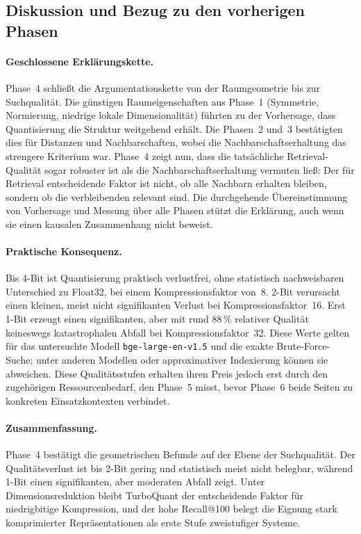 \subsection{Diskussion und Bezug zu den vorherigen Phasen}
%
\paragraph{Geschlossene Erklärungskette.}
Phase~4 schließt die Argumentationskette von der Raumgeometrie bis zur Suchqualität.
Die günstigen Raumeigenschaften aus Phase~1 (Symmetrie, Normierung, niedrige lokale Dimensionalität) führten zu der Vorhersage, dass Quantisierung die Struktur weitgehend erhält.
Die Phasen~2 und~3 bestätigten dies für Distanzen und Nachbarschaften, wobei die Nachbarschaftserhaltung das strengere Kriterium war.
Phase~4 zeigt nun, dass die tatsächliche Retrieval-Qualität sogar robuster ist als die Nachbarschaftserhaltung vermuten ließ: Der für Retrieval entscheidende Faktor ist nicht, ob alle Nachbarn erhalten bleiben, sondern ob die verbleibenden relevant sind.
Die durchgehende Übereinstimmung von Vorhersage und Messung über alle Phasen stützt die Erklärung, auch wenn sie einen kausalen Zusammenhang nicht beweist.
%
\paragraph{Praktische Konsequenz.}
Bis 4-Bit ist Quantisierung praktisch verlustfrei, ohne statistisch nachweisbaren Unterschied zu Float32, bei einem Kompressionsfaktor von~8.
2-Bit verursacht einen kleinen, meist nicht signifikanten Verlust bei Kompressionsfaktor~16.
Erst 1-Bit erzeugt einen signifikanten, aber mit rund 88\,\% relativer Qualität keineswegs katastrophalen Abfall bei Kompressionsfaktor~32.
Diese Werte gelten für das untersuchte Modell \texttt{bge-\allowbreak large-\allowbreak en-\allowbreak v1.5} und die exakte Brute-Force-Suche; unter anderen Modellen oder approximativer Indexierung können sie abweichen.
Diese Qualitätsstufen erhalten ihren Preis jedoch erst durch den zugehörigen Ressourcenbedarf, den Phase~5 misst, bevor Phase~6 beide Seiten zu konkreten Einsatzkontexten verbindet.
%
\paragraph{Zusammenfassung.}
Phase~4 bestätigt die geometrischen Befunde auf der Ebene der Suchqualität.
Der Qualitätsverlust ist bis 2-Bit gering und statistisch meist nicht belegbar, während 1-Bit einen signifikanten, aber moderaten Abfall zeigt.
Unter Dimensionsreduktion bleibt TurboQuant der entscheidende Faktor für niedrigbitige Kompression, und der hohe Recall@100 belegt die Eignung stark komprimierter Repräsentationen als erste Stufe zweistufiger Systeme.
%
